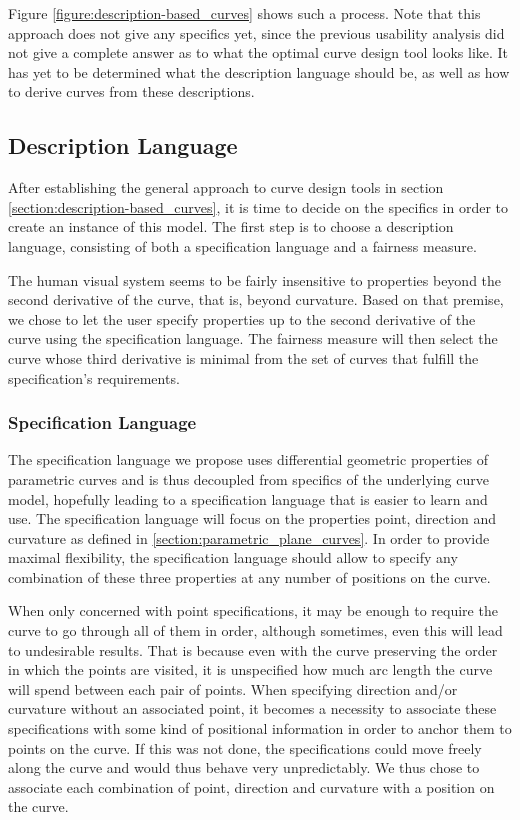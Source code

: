 \documentclass[a4paper]{article}
\begin{document}
			Figure \ref{figure:description-based_curves} shows such a process. Note that this approach does not give any specifics yet, since the previous usability analysis did not give a complete answer as to what the optimal curve design tool looks like. It has yet to be determined what the description language should be, as well as how to derive curves from these descriptions.

		\subsection{Description Language}
		\label{section:description_language}
			
			After establishing the general approach to curve design tools in section \ref{section:description-based_curves}, it is time to decide on the specifics in order to create an instance of this model. The first step is to choose a description language, consisting of both a specification language and a fairness measure.

			The human visual system seems to be fairly insensitive to properties beyond the second derivative of the curve, that is, beyond curvature. Based on that premise, we chose to let the user specify properties up to the second derivative of the curve using the specification language. The fairness measure will then select the curve whose third derivative is minimal from the set of curves that fulfill the specification's requirements.

			\subsubsection{Specification Language}
			\label{section:specification_language}

				The specification language we propose uses differential geometric properties of parametric curves and is thus decoupled from specifics of the underlying curve model, hopefully leading to a specification language that is easier to learn and use. The specification language will focus on the properties point, direction and curvature as defined in \ref{section:parametric_plane_curves}. In order to provide maximal flexibility, the specification language should allow to specify any combination of these three properties at any number of positions on the curve.

				When only concerned with point specifications, it may be enough to require the curve to go through all of them in order, although sometimes, even this will lead to undesirable results. That is because even with the curve preserving the order in which the points are visited, it is unspecified how much arc length the curve will spend between each pair of points. When specifying direction and/or curvature without an associated point, it becomes a necessity to associate these specifications with some kind of positional information in order to anchor them to points on the curve. If this was not done, the specifications could move freely along the curve and would thus behave very unpredictably. We thus chose to associate each combination of point, direction and curvature with a position on the curve.
\end{document}
